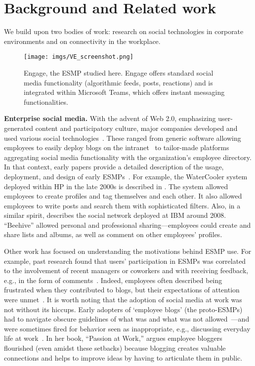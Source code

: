 \section{Background and Related work}
We build upon two bodies of work: research on social technologies in corporate environments and on connectivity in the workplace.

\begin{figure*}[t]
    \centering
    \texttt{[image: imgs/VE\_screenshot.png]}
    \caption{Engage, the ESMP studied here. Engage offers standard social media functionality (algorithmic feeds, posts, reactions) and is integrated within Microsoft Teams, which offers instant messaging functionalities.}
    \label{fig:enter-label}
\end{figure*}

\vspace{0.5mm}
\noindent
\textbf{Enterprise social media.}
With the advent of Web 2.0, emphasizing user-generated content and participatory culture, major companies developed and used various social technologies~\cite{mcafee2006enterprise}.
These ranged from generic software allowing employees to easily deploy blogs on the intranet~\cite{yardi2008pulse, efimova2007crossing} to tailor-made platforms aggregating social media functionality with the organization's employee directory. 
In that context, early papers provide a detailed description of the usage, deployment, and design of early ESMPs~\cite{brzozowski2009watercooler, dimicco2008motivations, efimova2007crossing, kolari2007structure}. 
For example, the WaterCooler system deployed within HP in the late 2000s is described in \citet{brzozowski2009watercooler}. The system allowed employees to create profiles and tag themselves and each other. It also allowed employees 
to write posts and search them with sophisticated filters.
Also, in a similar spirit,  \citet{dimicco2008motivations} describes the social network deployed at IBM around 2008. ``Beehive'' allowed personal and professional sharing---employees could create and share lists and albums, as well as comment on other employees' profiles.

Other work has focused on understanding the motivations behind ESMP use. 
For example, past research found that users' participation in ESMPs was correlated to the involvement of recent managers or coworkers and with receiving feedback, e.g., in the form of comments~\cite{brzozowski2009effects}.
Indeed, employees often described being frustrated when they contributed to blogs, but their expectations of attention were unmet~\cite{yardi2009blogging}. 
It is worth noting that the adoption of social media at work was not without its hiccups. Early adopters of `employee blogs' (the proto-ESMPs) had to navigate obscure guidelines of what was and what was not allowed~\cite{efimova2009passion}---and were sometimes fired for behavior seen as inappropriate, e.g., discussing everyday life at work~\cite{coneRiseBlog2005}. In her book, ``Passion at Work,'' \citet{efimova2009passion} argues employee bloggers flourished (even amidst these setbacks) because blogging creates valuable connections and helps to improve ideas by having to articulate them in public.


